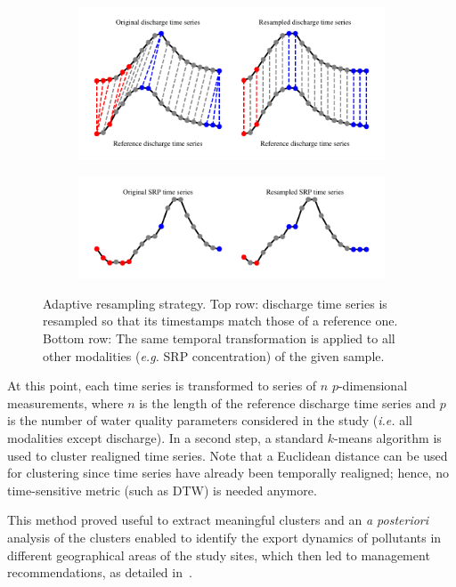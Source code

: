 \begin{figure}[t]
    \begin{subfigure}[b]{\textwidth}
         \centering
         \includegraphics[width=\textwidth]{fig/dtw_da}
     \end{subfigure}
      \begin{subfigure}[b]{\textwidth}
           \centering
           \includegraphics[width=\textwidth]{fig/dtw_da_b}
       \end{subfigure}
    \caption{Adaptive resampling strategy. Top row: discharge time series is
    resampled so that its timestamps match those of a reference one. Bottom row:
    The same temporal transformation is applied to all other modalities
    (\emph{e.g.} SRP concentration) of the given sample.}
    \label{fig:dtw_da}
\end{figure}

At this point, each time series is transformed to series of $n$
$p$-dimensional measurements, where $n$ is the length of the
reference discharge time series and $p$ is the number of water quality
parameters considered in the study (\emph{i.e.} all modalities except discharge).
In a second step, a standard $k$-means algorithm is used to cluster
realigned time series.
Note that a Euclidean distance can be used for clustering since time series
have already been temporally realigned; hence, no time-sensitive metric (such as
DTW) is needed anymore.

This method proved useful to extract meaningful clusters and an \emph{a posteriori}
analysis of the clusters enabled to identify the export dynamics of pollutants
in different geographical areas of the study sites, which then led to management
recommendations, as detailed in~\cite{dupas:halshs-01228397}.

